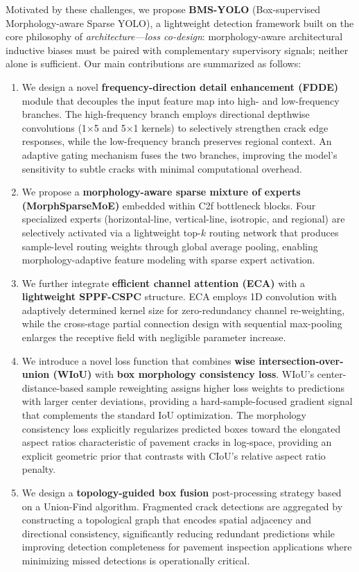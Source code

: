 \documentclass{ieeeaccess}
\begin{document}
Motivated by these challenges, we propose \textbf{BMS-YOLO} (Box-supervised Morphology-aware Sparse YOLO), a lightweight detection framework built on the core philosophy of \textit{architecture---loss co-design}: morphology-aware architectural inductive biases must be paired with complementary supervisory signals; neither alone is sufficient. Our main contributions are summarized as follows:

\begin{enumerate}
\item We design a novel \textbf{frequency-direction detail enhancement (FDDE)} module that decouples the input feature map into high- and low-frequency branches. The high-frequency branch employs directional depthwise convolutions (1$\times$5 and 5$\times$1 kernels) to selectively strengthen crack edge responses, while the low-frequency branch preserves regional context. An adaptive gating mechanism fuses the two branches, improving the model's sensitivity to subtle cracks with minimal computational overhead.

\item We propose a \textbf{morphology-aware sparse mixture of experts (MorphSparseMoE)} embedded within C2f bottleneck blocks. Four specialized experts (horizontal-line, vertical-line, isotropic, and regional) are selectively activated via a lightweight top-$k$ routing network that produces sample-level routing weights through global average pooling, enabling morphology-adaptive feature modeling with sparse expert activation.

\item We further integrate \textbf{efficient channel attention (ECA)} with a \textbf{lightweight SPPF-CSPC} structure. ECA employs 1D convolution with adaptively determined kernel size for zero-redundancy channel re-weighting, while the cross-stage partial connection design with sequential max-pooling enlarges the receptive field with negligible parameter increase.

\item We introduce a novel loss function that combines \textbf{wise intersection-over-union (WIoU)} with \textbf{box morphology consistency loss}. WIoU's center-distance-based sample reweighting assigns higher loss weights to predictions with larger center deviations, providing a hard-sample-focused gradient signal that complements the standard IoU optimization. The morphology consistency loss explicitly regularizes predicted boxes toward the elongated aspect ratios characteristic of pavement cracks in log-space, providing an explicit geometric prior that contrasts with CIoU's relative aspect ratio penalty.

\item We design a \textbf{topology-guided box fusion} post-processing strategy based on a Union-Find algorithm. Fragmented crack detections are aggregated by constructing a topological graph that encodes spatial adjacency and directional consistency, significantly reducing redundant predictions while improving detection completeness for pavement inspection applications where minimizing missed detections is operationally critical.
\end{enumerate}
\end{document}
